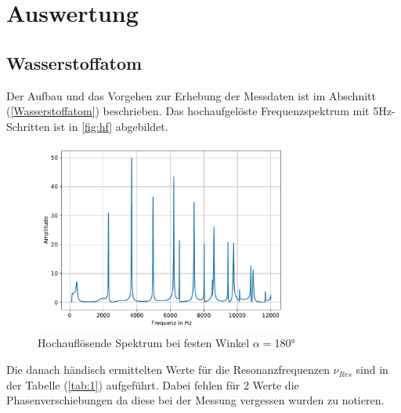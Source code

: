 \newpage
\section{Auswertung}
\label{sec:Auswertung}

\subsection{Wasserstoffatom}

Der Aufbau und das Vorgehen zur Erhebung der Messdaten ist im Abschnitt (\ref{Wasserstoffatom}) beschrieben. Das hochaufgelöste Frequenzspektrum mit 5Hz-Schritten
ist in \autoref{fig:hf} abgebildet.

\begin{figure}
    \centering
    \includegraphics[width=0.75\textwidth]{pic/Wasserstoffatom.pdf}
    \caption{Hochauflösende Spektrum bei festen Winkel $\alpha=$180°}
    \label{fig:hf}
  \end{figure}

\noindent
Die danach händisch ermittelten Werte für die Resonanzfrequenzen $\nu_{Res}$ sind in der Tabelle (\ref{tab:1}) aufgeführt. Dabei fehlen für 2 Werte die Phasenverschiebungen
da diese bei der Messung vergessen wurden zu notieren.

